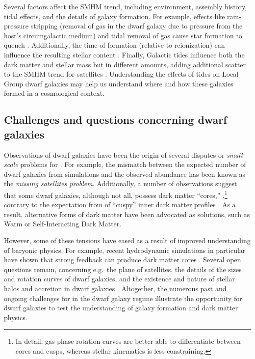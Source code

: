 Several factors affect the SMHM trend, including environment, assembly
history, tidal effects, and the details of galaxy formation. For
example, effects like ram-pressure stripping (removal of gas in the
dwarf galaxy due to pressure from the host's circumgalactic medium) and
tidal removal of gas cause star formation to quench
\citep[e.g.,][]{christensen+2024}. Additionally, the time of formation
(relative to reionization) can influence the resulting stellar content
\citep{kim+2024}. Finally, Galactic tides influence both the dark matter
and stellar mass but in different amounts, adding additional scatter to
the SMHM trend for satellites \citep[e.g.,][]{PNM2008, fattahi+2018}.
Understanding the effects of tides on Local Group dwarf galaxies may
help us understand where and how these galaxies formed in a cosmological
context.

\subsection{Challenges and questions concerning dwarf
galaxies}\label{challenges-and-questions-concerning-dwarf-galaxies}

Observations of dwarf galaxies have been the origin of several disputes
or \emph{small-scale} problems for \LCDM{} \citep[see reviews
by][]{bullock+boylan-kolchin2017, sales+2022}. For example, the mismatch
between the expected number of dwarf galaxies from simulations and the
observed abundance has been known as the \emph{missing satellites
problem}. Additionally, a number of observations suggest that some dwarf
galaxies, although not all, possess dark matter ``cores,''
\citep[e.g.,][]{moore1994, adams+2014, oh+2015, walker+penarrubia2011, read+walker+steger2019},\footnote{In
  detail, gas-phase rotation curves are better able to differentiate
  between cores and cusps, whereas stellar kinematics is less
  constraining.} contrary to the expectation from \LCDM{} of ``cuspy''
inner dark matter profiles \citep{NFW1996, NFW1997}. As a result,
alternative forms of dark matter have been advocated as solutions, such
as Warm or Self-Interacting Dark Matter.

However, some of these tensions have eased as a result of improved
understanding of baryonic physics. For example, recent hydrodynamic
simulations in particular have shown that strong feedback can produce
dark matter cores
\citetext{\citealp[e.g.,][\citet{tollet+2016}]{navarro+eke+frenk1996}; \citealp{fitts+2017}; \citealp{benitez-llambay+2019}; \citealp{orkney+2021}}.
Several open questions remain, concerning e.g.~the plane of satellites,
the details of the sizes and rotation curves of dwarf galaxies, and the
existence and nature of stellar halos and accretion in dwarf galaxies
\citep[e.g.,][]{sales+2022}. Altogether, the numerous past and ongoing
challenges for \LCDM{} in the dwarf galaxy regime illustrate the
opportunity for dwarf galaxies to test the understanding of galaxy
formation and dark matter physics.


